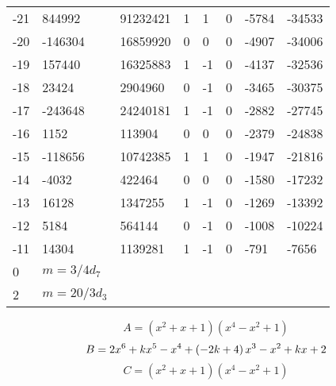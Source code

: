 \documentclass{amsart}
\begin{document}
\begin{longtable}{|l|l|l|lllll|}
-21&844992&91232421&1&1&0&-5784&-34533\\
-20&-146304&16859920&0&0&0&-4907&-34006\\
-19&157440&16325883&1&-1&0&-4137&-32536\\
-18&23424&2904960&0&-1&0&-3465&-30375\\
-17&-243648&24240181&1&-1&0&-2882&-27745\\
-16&1152&113904&0&0&0&-2379&-24838\\
-15&-118656&10742385&1&1&0&-1947&-21816\\
-14&-4032&422464&0&0&0&-1580&-17232\\
-13&16128&1347255&1&-1&0&-1269&-13392\\
-12&5184&564144&0&-1&0&-1008&-10224\\
-11&14304&1139281&1&-1&0&-791&-7656\\
0&$m=3/4d_{7}$&&\multicolumn{5}{c|}{}\\
2&$m=20/3d_{3}$&&\multicolumn{5}{c|}{}\\
\hline
\end{longtable}
$$A=(x^2
 + x
 + 1)(x^4
 - x^2
 + 1)$$
$$B=2\*x^6
 + k\*x^5
 - x^4
 + \left(-2\*k
 + 4\right) \*x^3
 - x^2
 + k\*x
 + 2$$
$$C=(x^2
 + x
 + 1)(x^4
 - x^2
 + 1)$$
\end{document}
